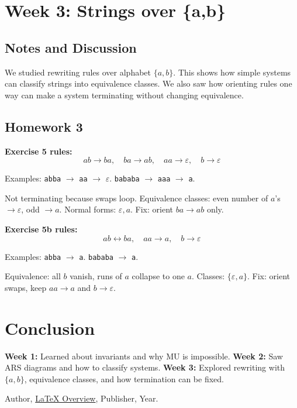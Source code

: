\documentclass{article}
\theoremstyle{theorem}
\theoremstyle{definition}
\theoremstyle{remark}
\begin{document}
\section{Week 3: Strings over \{a,b\}}

\subsection{Notes and Discussion}
We studied rewriting rules over alphabet $\{a,b\}$. 
This shows how simple systems can classify strings into equivalence classes. 
We also saw how orienting rules one way can make a system terminating without changing equivalence.

\subsection{Homework 3}
\textbf{Exercise 5 rules:}
\[
ab \to ba,\quad ba \to ab,\quad aa \to \varepsilon,\quad b \to \varepsilon
\]

Examples: \texttt{abba} $\to$ \texttt{aa} $\to$ $\varepsilon$.  
\texttt{bababa} $\to$ \texttt{aaa} $\to$ \texttt{a}.  

Not terminating because swaps loop.  
Equivalence classes: even number of $a$’s $\to \varepsilon$, odd $\to a$.  
Normal forms: $\varepsilon, a$.  
Fix: orient $ba \to ab$ only.  

\textbf{Exercise 5b rules:}
\[
ab \leftrightarrow ba,\quad aa \to a,\quad b \to \varepsilon
\]

Examples: \texttt{abba} $\to$ \texttt{a}. \texttt{bababa} $\to$ \texttt{a}.  

Equivalence: all $b$ vanish, runs of $a$ collapse to one $a$.  
Classes: $\{\varepsilon,a\}$.  
Fix: orient swaps, keep $aa \to a$ and $b \to \varepsilon$.  

\section{Conclusion}
\textbf{Week 1:} Learned about invariants and why MU is impossible.  
\textbf{Week 2:} Saw ARS diagrams and how to classify systems.  
\textbf{Week 3:} Explored rewriting with $\{a,b\}$, equivalence classes, and how termination can be fixed.

\begin{thebibliography}{99}
 Author, \href{https://en.wikipedia.org/wiki/LaTeX}{LaTeX Overview}, Publisher, Year.
\end{thebibliography}
\end{document}
